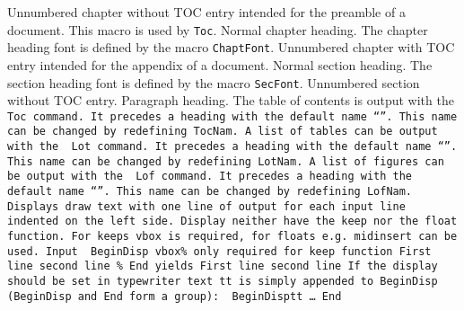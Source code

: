 \endinsert
{}%
%
\BeginDesc
{}
%
Unnumbered chapter without TOC entry intended for the preamble of a document.
This macro is used by {\tt\RS Toc}.
%
Normal chapter heading.
The chapter heading font is defined by the macro
{\tt\RS ChaptFont}.
%
Unnumbered chapter with TOC entry intended for the appendix of a document.
\End
{}%
\BeginDesc
{}
%
Normal section heading.
The section heading font is defined by the macro
{\tt\RS SecFont}.
%
Unnumbered section without TOC entry.
\End
{}%
\BeginDesc
{}
%
Paragraph heading.
\End
{}%
The table of contents is output with the
\BeginDisp\tt
\RS Toc
\End
command.
It precedes a heading with the default name ``\TocNam''.
This name can be changed by redefining {\tt\RS TocNam}.
%
A list of tables can be output with the
\BeginDisp\tt
\RS Lot
\End
command.
It precedes a heading with the default name ``\LotNam''.
This name can be changed by redefining {\tt\RS LotNam}.
%
A list of figures can be output with the
\BeginDisp\tt
\RS Lof
\End
command.
It precedes a heading with the default name ``\LofNam''.
This name can be changed by redefining {\tt\RS LofNam}.
%
Displays draw text with one line of output for each input line
indented on the left side.
Display neither have the keep nor the float
function.
For keeps {\tt\RS vbox} is required, for floats e.g.
{\tt\RS midinsert} can be used.
Input
\BeginDisp\tt
\vbox{%
\RS BeginDisp
\RS vbox\lC\% only required for keep function
First line
second line
\rC\%
\RS End
}%
\End
yields
\BeginDisp
First line
second line
\End
If the display should be set in typewriter text {\tt\RS tt} is
simply appended to {\tt\RS BeginDisp}
({\tt\RS BeginDisp} and {\tt\RS End} form a group):
\BeginDisp\tt
\RS BeginDisp\RS tt
{\rm\dots}
\RS End
\End

